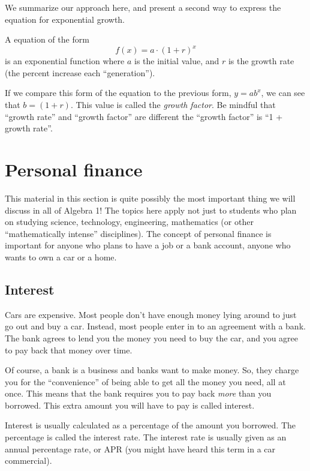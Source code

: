 We summarize our approach here, and present a second way to express the equation for exponential growth.

\begin{boxdef}
A equation of the form \[f(x) = a\cdot(1+r)^x\] is an exponential function where $a$ is the initial value, and $r$ is the growth rate (the percent increase each ``generation'').
\end{boxdef}

If we compare this form of the equation to the previous form, $y=ab^x$, we can see that $b=(1+r)$. This value is called the \textit{growth factor}. Be mindful that ``growth rate'' and ``growth factor'' are different the ``growth factor'' is ``1 + growth rate''.


\section{Personal finance}
\label{sec:expofinance}

This material in this section is quite possibly the most important thing we will discuss in all of Algebra 1! The topics here apply not just to students who plan on studying science, technology, engineering, mathematics (or other ``mathematically intense'' disciplines). The concept of personal finance is important for anyone who plans to have a job or a bank account, anyone who wants to own a car or a home.

\subsection{Interest}

Cars are expensive. Most people don't have enough money lying around to just go out and buy a car. Instead, most people enter in to an agreement with a bank. The bank agrees to lend you the money you need to buy the car, and you agree to pay back that money over time.

Of course, a bank is a business and banks want to make money. So, they charge you for the ``convenience'' of being able to get all the money you need, all at once. This means that the bank requires you to pay back \textit{more} than you borrowed. This extra amount you will have to pay is called \gls{interest}.

Interest is usually calculated as a percentage of the amount you borrowed. The percentage is called the \gls{interest rate}. The interest rate is usually given as an annual percentage rate, or APR (you might have heard this term in a car commercial).

